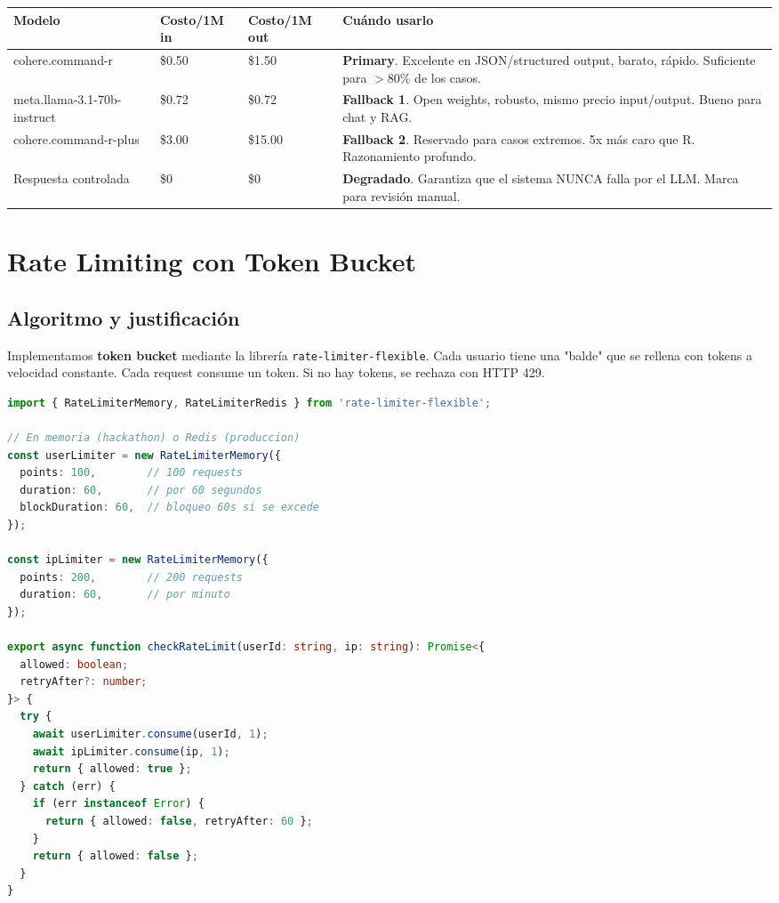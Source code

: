 \documentclass[11pt,a4paper]{article}
\begin{document}
\begin{longtable}{|p{4cm}|p{2.5cm}|p{2.5cm}|p{4.5cm}|}
\hline
\rowcolor{primary!20}
\textbf{Modelo} & \textbf{Costo/1M in} & \textbf{Costo/1M out} & \textbf{Cu\'ando usarlo} \\
\hline
\endhead
cohere.command-r & \$0.50 & \$1.50 & \textbf{Primary}. Excelente en JSON/structured output, barato, r\'apido. Suficiente para $>$80\% de los casos. \\
\hline
meta.llama-3.1-70b-instruct & \$0.72 & \$0.72 & \textbf{Fallback 1}. Open weights, robusto, mismo precio input/output. Bueno para chat y RAG. \\
\hline
cohere.command-r-plus & \$3.00 & \$15.00 & \textbf{Fallback 2}. Reservado para casos extremos. 5x m\'as caro que R. Razonamiento profundo. \\
\hline
Respuesta controlada & \$0 & \$0 & \textbf{Degradado}. Garantiza que el sistema NUNCA falla por el LLM. Marca para revisi\'on manual. \\
\hline
\end{longtable}

\section{Rate Limiting con Token Bucket}

\subsection{Algoritmo y justificaci\'on}

Implementamos \textbf{token bucket} mediante la librer\'ia \texttt{rate-limiter-flexible}. Cada usuario tiene una "balde" que se rellena con tokens a velocidad constante. Cada request consume un token. Si no hay tokens, se rechaza con HTTP 429.

\begin{lstlisting}[language=TypeScript, caption={Rate limiter por usuario y por IP}]
import { RateLimiterMemory, RateLimiterRedis } from 'rate-limiter-flexible';

// En memoria (hackathon) o Redis (produccion)
const userLimiter = new RateLimiterMemory({
  points: 100,        // 100 requests
  duration: 60,       // por 60 segundos
  blockDuration: 60,  // bloqueo 60s si se excede
});

const ipLimiter = new RateLimiterMemory({
  points: 200,        // 200 requests
  duration: 60,       // por minuto
});

export async function checkRateLimit(userId: string, ip: string): Promise<{
  allowed: boolean;
  retryAfter?: number;
}> {
  try {
    await userLimiter.consume(userId, 1);
    await ipLimiter.consume(ip, 1);
    return { allowed: true };
  } catch (err) {
    if (err instanceof Error) {
      return { allowed: false, retryAfter: 60 };
    }
    return { allowed: false };
  }
}
\end{lstlisting}
\end{document}
